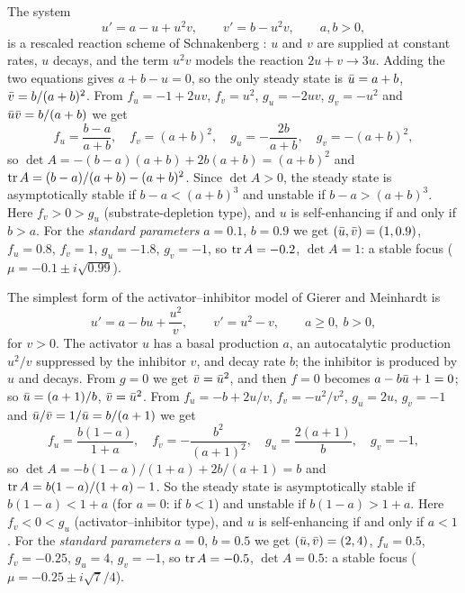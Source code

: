 \begin{example}\label{ex:schnakenberg}
The system
\begin{equation}\label{eq:schnakenberg}
  u' = a-u+u^2v,\qquad v'=b-u^2v,\qquad a,b>0,
\end{equation}
is a rescaled reaction scheme of Schnakenberg \cite{Schnakenberg1979}: $u$ and $v$
are supplied at constant rates, $u$ decays, and the term $u^2v$ models the
reaction $2u+v\to3u$. Adding the two
equations gives $a+b-u=0$, so the only steady state is $\bar u=a+b$,
$\bar v=b/(a+b)^2$. From $f_u=-1+2uv$, $f_v=u^2$, $g_u=-2uv$, $g_v=-u^2$ and
$\bar u\bar v=b/(a+b)$ we get
\begin{equation*}
  f_u=\frac{b-a}{a+b},\quad f_v=(a+b)^2,\quad g_u=-\frac{2b}{a+b},\quad g_v=-(a+b)^2,
\end{equation*}
so $\det A=-(b-a)(a+b)+2b(a+b)=(a+b)^2$ and $\operatorname{tr} A=(b-a)/(a+b)-(a+b)^2$. Since
$\det A>0$, the steady state is asymptotically stable if $b-a<(a+b)^3$ and
unstable if $b-a>(a+b)^3$. Here $f_v>0>g_u$ (substrate-depletion
type), and $u$ is self-enhancing if and only if $b>a$. For the
\emph{standard parameters} $a=0.1$, $b=0.9$ we get $(\bar u,\bar v)=(1,0.9)$, $f_u=0.8$,
$f_v=1$, $g_u=-1.8$, $g_v=-1$, so $\operatorname{tr} A=-0.2$, $\det A=1$: a stable focus
($\mu=-0.1\pm i\sqrt{0.99}$).
\end{example}

\begin{example}\label{ex:gierer-meinhardt}
The simplest form of the activator--inhibitor model of Gierer and Meinhardt
\cite{GiererMeinhardt1972} is
\begin{equation}\label{eq:gierer-meinhardt}
  u' = a-bu+\frac{u^2}{v},\qquad v'=u^2-v,\qquad a\ge0,\ b>0,
\end{equation}
for $v>0$. The activator $u$ has a basal production $a$, an autocatalytic
production $u^2/v$ suppressed by the inhibitor $v$, and decay rate $b$; the
inhibitor is produced by $u$ and decays.
From $g=0$ we get $\bar v=\bar u^2$, and then $f=0$ becomes $a-b\bar u+1=0$; so
$\bar u=(a+1)/b$, $\bar v=\bar u^2$. From $f_u=-b+2u/v$, $f_v=-u^2/v^2$, $g_u=2u$,
$g_v=-1$ and $\bar u/\bar v=1/\bar u=b/(a+1)$ we get
\begin{equation*}
  f_u=\frac{b(1-a)}{1+a},\quad f_v=-\frac{b^2}{(a+1)^2},\quad g_u=\frac{2(a+1)}{b},\quad g_v=-1,
\end{equation*}
so $\det A=-b(1-a)/(1+a)+2b/(a+1)=b$ and $\operatorname{tr} A=b(1-a)/(1+a)-1$. So the steady
state is asymptotically stable if $b(1-a)<1+a$ (for $a=0$: if $b<1$) and unstable if $b(1-a)>1+a$. Here $f_v<0<g_u$ (activator--inhibitor
type), and $u$ is self-enhancing if and only if $a<1$. For the
\emph{standard parameters} $a=0$, $b=0.5$ we get $(\bar u,\bar v)=(2,4)$, $f_u=0.5$,
$f_v=-0.25$, $g_u=4$, $g_v=-1$, so $\operatorname{tr} A=-0.5$, $\det A=0.5$: a stable focus
($\mu=-0.25\pm i\sqrt7/4$).
\end{example}

